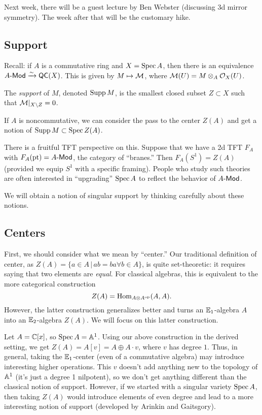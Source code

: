 \documentclass{article}
\begin{document}
Next week, there will be a guest lecture by Ben Webster (discussing 3d mirror symmetry).
The week after that will be the customary hike.

\subsection{Support}

Recall: if $A$ is a commutative ring and $X = \Spec A$, then there is an equivalence $A\dMod \xrightarrow{\sim} \QC(X)$.
This is given by $M \mapsto \Mc$, where $\Mc(U) = M \otimes_A \Oc_X(U)$.

\begin{dfn}
	The \emph{support} of $M$, denoted $\Supp M$, is the smallest closed subset $Z \subset X$ such that $\Mc|_{X \setminus Z} = 0$.
\end{dfn}

If $A$ is noncommutative, we can consider the pass to the center $Z(A)$ and get a notion of $\Supp M \subset \Spec Z(A)$.

\begin{rmk}
	There is a fruitful TFT perspective on this.
	Suppose that we have a 2d TFT $F_A$ with $F_A(\pt) = A\dMod$, the category of ``branes.''
	Then $F_A(S^1)= Z(A)$ (provided we equip $S^1$ with a specific framing).
	People who study such theories are often interested in ``upgrading'' $\Spec A$ to reflect the behavior of $A\dMod$.
\end{rmk}

We will obtain a notion of singular support by thinking carefully about these notions.

\subsection{Centers}

First, we should consider what we mean by ``center.''
Our traditional definition of center, as $Z(A) = \{ a \in A \, | \, ab = ba \forall b \in A \}$, is quite set-theoretic: it requires saying that two elements are \emph{equal}.
For classical algebras, this is equivalent to the more categorical construction 
\[
	Z(A) = \Hom_{A \otimes A\op}(A, A).
\]
However, the latter construction generalizes better and turns an $\EE_1$-algebra $A$ into an $\EE_2$-algebra $Z(A)$.
We will focus on this latter construction.

\begin{ex}
	Let $A = \CC[x]$, so $\Spec A = \AA^1$.
	Using our above construction in the derived setting, we get $Z(A) = A[v] = A \oplus A \cdot v$, where $v$ has degree $1$.
	Thus, in general, taking the $\EE_1$-center (even of a commutative algebra) may introduce interesting higher operations.
	This $v$ doesn't add anything new to the topology of $\AA^1$ (it's just a degree 1 nilpotent), so we don't get anything different than the classical notion of support.
	However, if we started with a singular variety $\Spec A$, then taking $Z(A)$ would introduce elements of even degree and lead to a more interesting notion of support (developed by Arinkin and Gaitsgory).
\end{ex}
\end{document}

